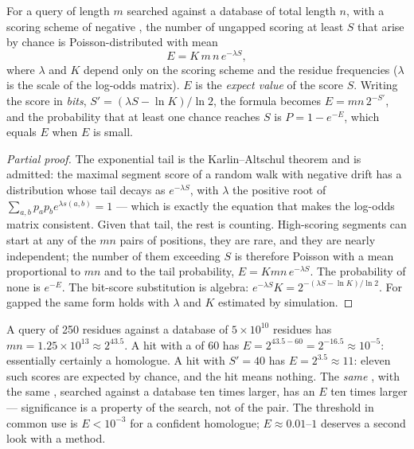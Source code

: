 \begin{theorem}\label{thm:b3:bioinformatics:evalue}
For a query of length $m$ searched against a database of total length
$n$, with a scoring scheme of negative , the number of
ungapped  scoring at least $S$ that arise by chance is
Poisson-distributed with mean
\[
E = K\,m\,n\,e^{-\lambda S},
\]
where $\lambda$ and $K$ depend only on the scoring scheme and the
residue frequencies ($\lambda$ is the scale of the log-odds matrix).
$E$ is the \emph{expect value} of the score $S$. Writing the score in
\emph{bits}, $S' = (\lambda S - \ln K)/\ln 2$, the formula becomes
$E = m n\, 2^{-S'}$, and the probability that at least one chance
 reaches $S$ is $P = 1 - e^{-E}$, which equals $E$ when $E$
is small.
\end{theorem}
\begin{proof}[Partial proof]
The exponential tail is the Karlin--Altschul theorem and is admitted:
the maximal segment score of a random walk with negative drift has a
distribution whose tail decays as $e^{-\lambda S}$, with $\lambda$ the
positive root of $\sum_{a,b} p_{a} p_{b} e^{\lambda s(a,b)} = 1$ ---
which is exactly the equation that makes the log-odds matrix consistent.
Given that tail, the rest is counting. High-scoring segments can start
at any of the $mn$ pairs of positions, they are rare, and they are
nearly independent; the number of them exceeding $S$ is therefore
Poisson with a mean proportional to $mn$ and to the tail probability,
$E = Kmn\,e^{-\lambda S}$. The probability of none is $e^{-E}$. The
bit-score substitution is algebra: $e^{-\lambda S} K = 2^{-(\lambda S -
\ln K)/\ln 2}$. For gapped  the same form holds with $\lambda$
and $K$ estimated by simulation.
\end{proof}

\begin{example}\label{ex:b3:bioinformatics:evalue}
A query of \num{250} residues against a database of $5\times 10^{10}$
residues has $mn = 1.25\times 10^{13} \approx 2^{43.5}$. A hit with a
 of $60$ has $E = 2^{43.5 - 60} = 2^{-16.5} \approx 10^{-5}$:
essentially certainly a homologue. A hit with $S' = 40$ has $E = 2^{3.5}
\approx 11$: eleven such scores are expected by chance, and the hit
means nothing. The \emph{same} , with the same ,
searched against a database ten times larger, has an $E$ ten times
larger --- significance is a property of the search, not of the pair.
The threshold in common use is $E < 10^{-3}$ for a confident homologue;
$E \approx 0.01$--$1$ deserves a second look with a  method.
\end{example}

